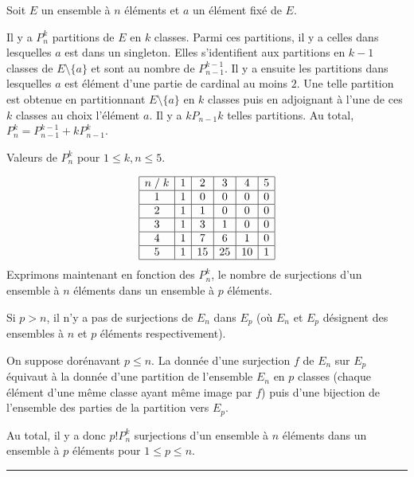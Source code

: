 \documentclass[11pt,a4paper]{article}
\newcommand{\fincorrection}{\vspace{1mm}\hrule\vspace*{7mm}}
\begin{document}
Soit $E$ un ensemble à $n$ éléments et $a$ un élément fixé de $E$.

Il y a $P_n^k$ partitions de $E$ en $k$ classes. Parmi ces partitions, il y a celles dans lesquelles $a$ est dans un singleton. Elles s'identifient aux partitions en $k-1$ classes de $E\setminus\{a\}$ et sont au nombre de $P_{n-1}^{k-1}$. Il y a ensuite les partitions dans lesquelles $a$ est élément d'une partie de cardinal au moins $2$. Une telle partition est obtenue en partitionnant $E\setminus\{a\}$ en $k$ classes puis en adjoignant à l'une de ces $k$ classes au choix l'élément $a$. Il y a $kP_{n-1}{k}$ telles partitions. Au total, $P_n^k=P_{n-1}^{k-1}+kP_{n-1}^k$.

Valeurs de $P_n^k$ pour $1\leq k,n\leq 5$.

$$\begin{array}{|c|c|c|c|c|c|}
\hline
n\;/\;k&1&2&3&4&5\\
\hline
1&1&0&0&0&0\\
\hline
2&1&1&0&0&0\\
\hline
3&1&3&1&0&0\\
\hline
4&1&7&6&1&0\\
\hline
5&1&15&25&10&1\\
\hline
\end{array}$$
Exprimons maintenant en fonction des $P_n^k$, le nombre de surjections d'un ensemble à $n$ éléments dans un ensemble à $p$ éléments.

Si $p>n$, il n'y a pas de surjections de $E_n$ dans $E_p$ (où $E_n$ et $E_p$ désignent des ensembles à $n$ et $p$ éléments respectivement).

On suppose dorénavant $p\leq n$. La donnée d'une surjection $f$ de $E_n$ sur $E_p$ équivaut à la donnée d'une partition de l'ensemble $E_n$ en $p$ classes (chaque élément d'une même classe ayant même image par $f$) puis d'une bijection de l'ensemble des parties de la partition vers $E_p$.

Au total, il y a donc $p!P_n^k$ surjections d'un ensemble à $n$ éléments dans un ensemble à $p$ éléments pour $1\leq p\leq n$.
\fincorrection
\end{document}
